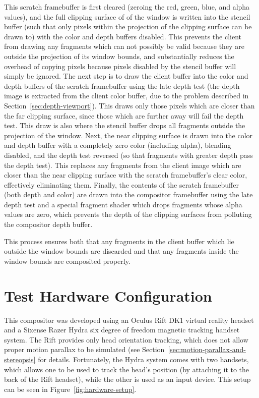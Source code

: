 This scratch framebuffer is first cleared (zeroing the red, green, blue, and alpha values), and the full clipping surface of of the window is written into the stencil buffer (such that only pixels within the projection of the clipping surface can be drawn to) with the color and depth buffers disabled. This prevents the client from drawing any fragments which can not possibly be valid because they are outside the projection of its window bounds, and substantially reduces the overhead of copying pixels because pixels disabled by the stencil buffer will simply be ignored. The next step is to draw the client buffer into the color and depth buffers of the scratch framebuffer using the late depth test (the depth image is extracted from the client color buffer, due to the problem described in Section~\ref{sec:depth-viewport}). This draws only those pixels which are closer than the far clipping surface, since those which are further away will fail the depth test. This draw is also where the stencil buffer drops all fragments outside the projection of the window. Next, the near clipping surface is drawn into the color and depth buffer with a completely zero color (including alpha), blending disabled, and the depth test reversed (so that fragments with greater depth pass the depth test). This replaces any fragments from the client image which are closer than the near clipping surface with the scratch framebuffer's clear color, effectively eliminating them. Finally, the contents of the scratch framebuffer (both depth and color) are drawn into the compositor framebuffer using the late depth test and a special fragment shader which drops fragments whose alpha values are zero, which prevents the depth of the clipping surfaces from polluting the compositor depth buffer. 

This process ensures both that any fragments in the client buffer which lie outside the window bounds are discarded and that any fragments inside the window bounds are composited properly.


\section{Test Hardware Configuration}

This compositor was developed using an Oculus Rift DK1 virtual reality headset and a Sixense Razer Hydra six degree of freedom magnetic tracking handset system. The Rift provides only head orientation tracking, which does not allow proper motion parallax to be simulated (see Section~\ref{sec:motion-parallax-and-stereopsis} for details. Fortunately, the Hydra system comes with two handsets, which allows one to be used to track the head's position (by attaching it to the back of the Rift headset), while the other is used as an input device. This setup can be seen in Figure~\ref{fig:hardware-setup}.













